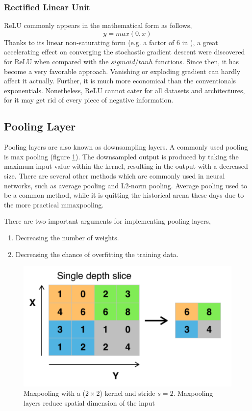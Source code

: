     \subsubsection{Rectified Linear Unit}
    ReLU commonly appears in the mathematical form as follows,
    \begin{equation}
        y = max(0, x)
    \end{equation}
    Thanks to its linear non-saturating form (e.g. a factor of 6 in \cite{krizhevsky2012imagenet}), a great accelerating effect on converging the stochastic gradient descent were discovered for ReLU when compared with the $sigmoid$/$tanh$ functions. Since then, it has become a very favorable approach. Vanishing or exploding gradient can hardly affect it actually. Further, it is much more economical than the conventionals exponentials. Nonetheless, ReLU cannot cater for all datasets and architectures, for it may get rid of every piece of negative information.

    \subsection{Pooling Layer}
    Pooling layers are also known as downsampling layers. A commonly used pooling is max pooling (figure \ref{maxpooling}). The downsampled output is produced by taking the maximum input value within the kernel, resulting in the output with a decreased size. There are several other methods which are commonly used in neural networks, such as average pooling and L2-norm pooling. Average pooling used to be a common method, while it is quitting the historical arena these days due to the more practical mmaxpooling\cite{scherer2010evaluation}.

    There are two important arguments for implementing pooling layers,
    \begin{enumerate}
        \item Decreasing the number of weights.
        \item Decreasing the chance of overfitting the training data.
    \end{enumerate}
    \begin{figure}[!h]
        \centering
        \includegraphics[scale=0.5]{Figures/Max_pooling.pdf}
        \caption{Maxpooling with a ($2\times 2$) kernel and stride $s=2$. Maxpooling layers reduce spatial dimension of the input \cite{li2015convolutional}}
        \label{maxpooling}
    \end{figure}

